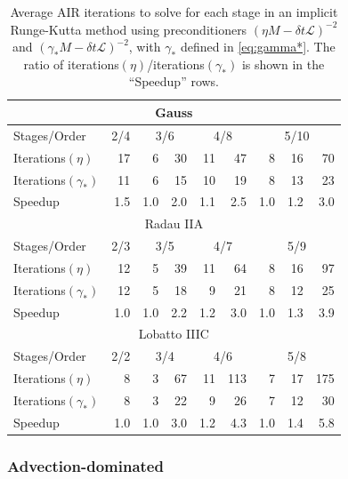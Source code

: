 \documentclass[a4paper,10pt]{article}
\begin{document}
{
\renewcommand{\arraystretch}{1.15}
\begin{table}[!ht]
  \centering
  \begin{tabular}{|l || r | rr | rr | rrr |}  %
  \hline
\multicolumn{9}{|c|}{Gauss}\\\hline
Stages/Order & 2/4 & \multicolumn{2}{c}{3/6} & \multicolumn{2}{|c}{4/8} & \multicolumn{3}{|c|}{5/10} \\\hline
Iterations$(\eta)$ & 17 & 6 & 30 & 11  & 47 & 8 & 16 & 70 \\
Iterations$(\gamma_*)$ & 11 & 6 & 15 & 10 & 19 & 8 & 13 & 23 \\\hline
Speedup & 1.5 & 1.0 & 2.0 & 1.1 & 2.5 & 1.0 & 1.2 & 3.0 \\\hline\hline
\multicolumn{9}{|c|}{Radau IIA}\\\hline
Stages/Order & 2/3 & \multicolumn{2}{c}{3/5} & \multicolumn{2}{|c}{4/7} & \multicolumn{3}{|c|}{5/9} \\\hline
Iterations$(\eta)$ & 12 & 5 & 39 & 11 & 64 & 8 & 16 & 97 \\
Iterations$(\gamma_*)$ & 12 & 5 & 18 & 9 & 21 & 8 & 12 & 25 \\\hline
Speedup & 1.0 & 1.0 & 2.2 & 1.2 & 3.0 & 1.0 & 1.3 & 3.9 \\\hline\hline
\multicolumn{9}{|c|}{Lobatto IIIC}\\\hline
Stages/Order & 2/2 & \multicolumn{2}{c}{3/4} & \multicolumn{2}{|c}{4/6} & \multicolumn{3}{|c|}{5/8} \\\hline
Iterations$(\eta)$ & 8 & 3 & 67 & 11 & 113 & 7 & 17 & 175 \\
Iterations$(\gamma_*)$ & 8 & 3 & 22 & 9 & 26 & 7 & 12 & 30 \\\hline
Speedup & 1.0 & 1.0 & 3.0 & 1.2 & 4.3 & 1.0 & 1.4 & 5.8 \\\hline\hline
  \end{tabular}
  \caption{Average AIR iterations to solve for each stage in an implicit
  Runge-Kutta method using preconditioners $(\eta M - \delta t \mathcal{L})^{-2}$ and
  $(\gamma_* M - \delta t \mathcal{L})^{-2}$, with $\gamma_*$ defined in \eqref{eq:gamma*}. 
  The ratio of iterations$(\eta)$/iterations$(\gamma_*)$ is shown in the ``Speedup'' rows.}
  \label{tab:gamma}
\end{table}
}


\subsubsection{Advection-dominated}\label{sec:numerics:dg:adv}
\end{document}
